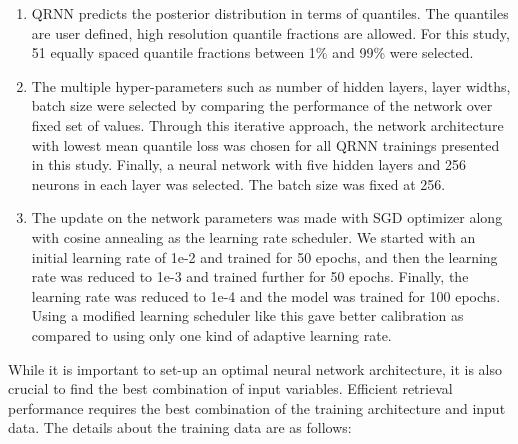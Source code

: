 \documentclass[amt, manuscript]{copernicus}
\begin{document}
\begin{enumerate}	
	
	\item QRNN predicts the posterior distribution in terms of quantiles. The quantiles are user defined, high resolution quantile fractions are allowed. For this study, 51 equally spaced quantile fractions between 1\% and 99\% were selected. 	
	
	\item The multiple hyper-parameters such as number of hidden layers, layer widths, batch size were selected by comparing the performance of the network over fixed set of values. Through this iterative approach, the network architecture with lowest mean quantile loss was chosen for all QRNN trainings presented in this study. Finally, a neural network with five hidden layers and 256 neurons in each layer was selected. The batch size was fixed at 256. 
	
	\item The update on the network parameters was made with SGD optimizer along with cosine annealing as the learning rate scheduler. We started with an initial learning rate of 1e-2 and trained for 50 epochs, and then the learning rate was reduced to 1e-3 and trained further for 50 epochs. Finally, the learning rate was reduced to 1e-4 and the model was trained for 100 epochs.
	Using a modified learning scheduler like this gave better calibration as compared to using only one kind of adaptive learning rate.
	
\end{enumerate}

While it is important to set-up an optimal neural network architecture, it is also crucial to find the best combination of input variables. Efficient retrieval performance requires the best combination of the training architecture and input data. The details about the training data are as follows: 
\end{document}
